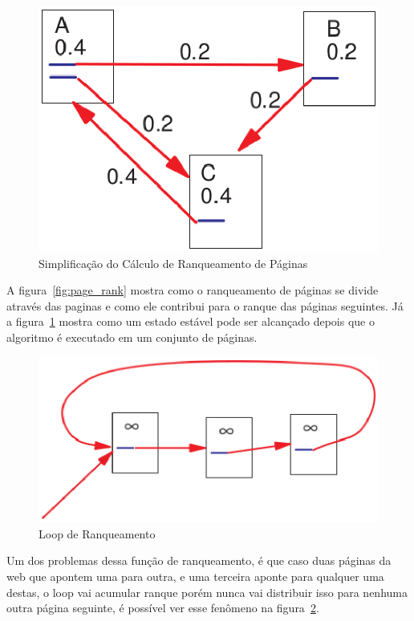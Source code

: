 \begin{figure}[h]
    \centering
\label{fig:page_rank2}
        \includegraphics[keepaspectratio=true,scale=0.5]{figuras/page_rank2.eps}
    \caption{Simplificação do Cálculo de Ranqueamento de Páginas}
\end{figure}

A figura~\ref{fig:page_rank} mostra como o ranqueamento de páginas se divide através
das paginas e como ele contribui para o ranque das páginas seguintes. Já a 
figura~\ref{fig:page_rank2} mostra como um estado estável pode ser alcançado
depois que o algoritmo é executado em um conjunto de páginas. 

\begin{figure}[h]
    \centering
\label{fig:page_rank3}
        \includegraphics[keepaspectratio=true,scale=0.5]{figuras/page_rank3.eps}
    \caption{Loop de Ranqueamento}
\end{figure}

Um dos problemas dessa função de ranqueamento, é que caso duas páginas da web que apontem uma para
outra, e uma terceira aponte para qualquer uma destas, o loop vai acumular ranque
porém nunca vai distribuir isso para nenhuma outra página seguinte, é possível
ver esse fenômeno na figura~\ref{fig:page_rank3}.


